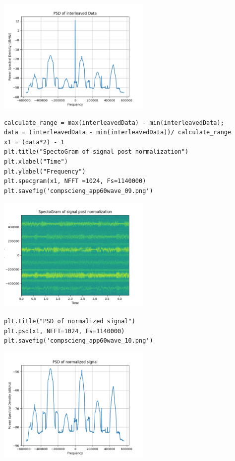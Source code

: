 \documentclass[12pt,fleqn]{article}\usepackage{../../common}
\begin{document}
\includegraphics[width=20em]{compscieng_app60wave_08.png}

\begin{verbatim}
calculate_range = max(interleavedData) - min(interleavedData);
data = (interleavedData - min(interleavedData))/ calculate_range
x1 = (data*2) - 1
plt.title("SpectoGram of signal post normalization")
plt.xlabel("Time")
plt.ylabel("Frequency")
plt.specgram(x1, NFFT =1024, Fs=1140000)
plt.savefig('compscieng_app60wave_09.png')
\end{verbatim}

\includegraphics[width=20em]{compscieng_app60wave_09.png}

\begin{verbatim}
plt.title("PSD of normalized signal")
plt.psd(x1, NFFT=1024, Fs=1140000)
plt.savefig('compscieng_app60wave_10.png')
\end{verbatim}

\includegraphics[width=20em]{compscieng_app60wave_10.png}
\end{document}
